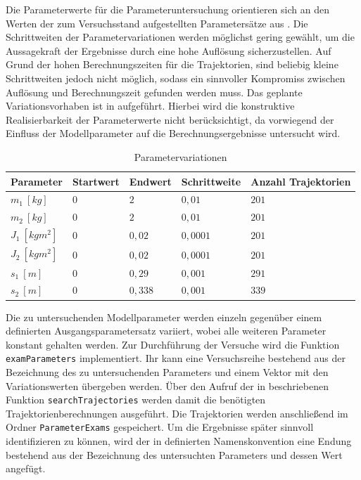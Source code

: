 Die Parameterwerte für die Parameteruntersuchung orientieren sich an den Werten der zum Versuchsstand aufgestellten Parametersätze aus . Die Schrittweiten der Parametervariationen werden möglichst gering gewählt, um die Aussagekraft der Ergebnisse durch eine hohe Auflösung sicherzustellen. Auf Grund der hohen Berechnungszeiten für die Trajektorien, sind beliebig kleine Schrittweiten jedoch nicht möglich, sodass ein sinnvoller Kompromiss zwischen Auflösung und Berechnungszeit gefunden werden muss. Das geplante Variationsvorhaben ist in  aufgeführt. Hierbei wird die konstruktive Realisierbarkeit der Parameterwerte nicht berücksichtigt, da vorwiegend der Einfluss der Modellparameter auf die Berechnungsergebnisse untersucht wird.
\begin{table}[h]
	\centering
	\caption{Parametervariationen}
		\begin{tabular}{lllll}
	    \toprule
			Parameter & Startwert & Endwert & Schrittweite & Anzahl Trajektorien \\
			\midrule
			$m_1 \ [\unit{kg}]$     & $0$ & $2$    & $0,01$   & $201$ \\
			$m_2 \ [\unit{kg}]$     & $0$ & $2$    & $0,01$   & $201$ \\
			$J_1 \ [\unit{kgm^2}]$  & $0$ & $0,02$ & $0,0001$ & $201$ \\
			$J_2 \ [\unit{kgm^2}]$  & $0$ & $0,02$ & $0,0001$ & $201$ \\
		  $s_1 \ [\unit{m}]$      & $0$ & $0,29$ & $0,001$  & $291$ \\
			$s_2 \ [\unit{m}]$      & $0$ & $0,338$& $0,001$  & $339$ \\
			\bottomrule
		\end{tabular}
	\label{tab:Parametervariationen}
\end{table}

Die zu untersuchenden Modellparameter werden einzeln gegenüber einem definierten Ausgangsparametersatz variiert, wobei alle weiteren Parameter konstant gehalten werden. Zur Durchführung der Versuche wird die Funktion \texttt{examParameters} implementiert. Ihr kann eine Versuchsreihe bestehend aus der Bezeichnung des zu untersuchenden Parameters und einem Vektor mit den Variationswerten übergeben werden. Über den Aufruf der in  beschriebenen Funktion \texttt{searchTrajectories} werden damit die benötigten Trajektorienberechnungen ausgeführt. Die Trajektorien werden anschließend im Ordner \texttt{ParameterExams} gespeichert. Um die Ergebnisse später sinnvoll identifizieren zu können, wird der in  definierten Namenskonvention eine Endung bestehend aus der Bezeichnung des untersuchten Parameters und dessen Wert angefügt. 

